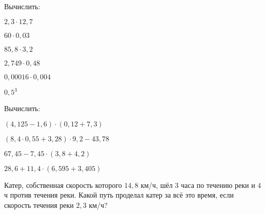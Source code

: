 \begin{class}[type=class, number=3]
\begin{listofex}
\begin{enumcols}[itemcolumns=2]
		\end{enumcols}
		\item Вычислить:
		\begin{enumcols}[itemcolumns=3]
			\item \( 2,3\cdot12,7 \)
			\item \( 60\cdot0,03 \)
			\item \( 85,8\cdot3,2 \)
			\item \( 2,749\cdot0,48 \)
			\item \( 0,00016\cdot0,004 \)
			\item \( 0,5^3 \)
		\end{enumcols}
		\item Вычислить:
		\begin{enumcols}[itemcolumns=2]
			\item \( (4,125-1,6)\cdot(0,12+7,3) \)
			\item \( (8,4\cdot0,55+3,28)\cdot9,2-43,78 \)
			\item \( 67,45-7,45\cdot(3,8+4,2) \)
			\item \( 28,6+11,4\cdot(6,595+3,405) \)
		\end{enumcols}
		\item Катер, собственная скорость которого \( 14,8 \) км/ч, шёл \( 3 \) часа по течению реки и \( 4 \) ч против течения реки. Какой путь проделал катер за всё это время, если скорость течения реки \( 2,3 \) км/ч?
	\end{listofex}
\end{class}
